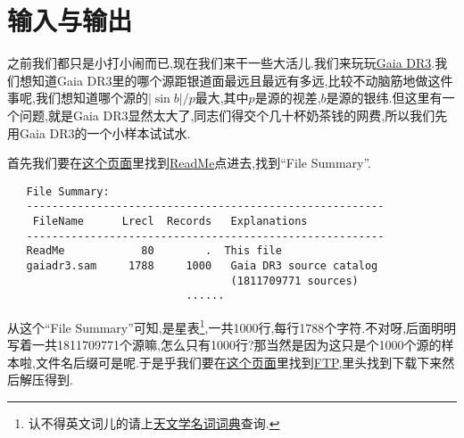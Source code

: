 \chapter{输入与输出}\label{io}

之前我们都只是小打小闹而已,现在我们来干一些大活儿.我们来玩玩\href{https://cdsarc.cds.unistra.fr/viz-bin/cat/I/355}{Gaia DR3}.我们想知道Gaia DR3里的哪个源距银道面最远且最远有多远,比较不动脑筋地做这件事呢,我们想知道哪个源的$\left\lvert \sin b\right\rvert/p$最大,其中$p$是源的视差,$b$是源的银纬.但这里有一个问题,就是Gaia DR3显然太大了,同志们得交个几十杯奶茶钱的网费,所以我们先用Gaia DR3的一个小样本试试水.

首先我们要在\href{https://cdsarc.cds.unistra.fr/viz-bin/cat/I/355}{这个页面}里找到\href{https://cdsarc.cds.unistra.fr/viz-bin/ReadMe/I/355?format=html&tex=true}{ReadMe}点进去,找到``File Summary''.
\begin{lstlisting}
   File Summary:
   --------------------------------------------------------
    FileName      Lrecl  Records   Explanations
   --------------------------------------------------------
   ReadMe            80        .  This file
   gaiadr3.sam     1788     1000   Gaia DR3 source catalog
                                   (1811709771 sources)
                            ......
\end{lstlisting}
从这个``File Summary''可知,是星表\footnote{认不得英文词儿的请上\href{https://nadc.china-vo.org/astrodict/}{天文学名词词典}查询.},一共1000行,每行1788个字符.不对呀,后面明明写着一共1811709771个源嘛,怎么只有1000行?那当然是因为这只是个1000个源的样本啦,文件名后缀可是呢.于是乎我们要在\href{https://cdsarc.cds.unistra.fr/viz-bin/cat/I/355}{这个页面}里找到\href{https://cdsarc.cds.unistra.fr/ftp/I/355}{FTP},里头找到\href{https://cdsarc.cds.unistra.fr/ftp/I/355/gaiadr3.sam.gz}{}下载下来然后解压得到.


